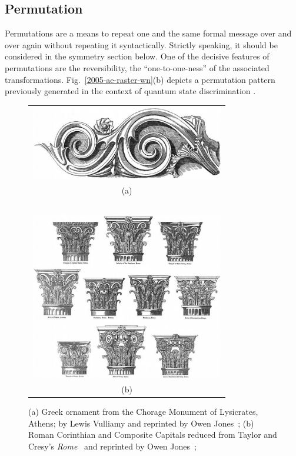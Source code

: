\documentclass[%
 reprint,
 showpacs,
 showkeys,
 amsmath,
 amssymb,
 aps,
 pra,
 longbibliography,
 floatfix,
 ]{revtex4-1}
\begin{document}
\subsection{Permutation}

Permutations are a means to repeat one and the same formal message over and
over again without repeating it syntactically. Strictly speaking, it should
be considered in the symmetry section below. One of the decisive features of
permutations are the reversibility, the ``one-to-one-ness'' of the
associated transformations.
Fig.~\ref{2005-ae-raster-wn}(b) depicts a permutation pattern previously generated
in the context of quantum state discrimination
\cite{DonSvo01,svozil-2002-statepart-prl,svozil-2004-kyoto,svozil-2003-garda}.

\begin{figure}[hptb]
\begin{center}
\begin{tabular}{c}
 \includegraphics[width=8.5cm]{2008-ae-greekornament1}\\
(a)\\
$\;$\\
 \includegraphics[width=8.5cm]{2008-ae-romanornament1}\\
(b)
\end{tabular}
\end{center}
   \caption{(a) Greek ornament from the Chorage Monument of Lysicrates, Athens; by Lewis Vulliamy and
reprinted by Owen Jones~\cite{jones-goo};
(b) Roman Corinthian and Composite Capitals reduced from Taylor and Cresy's {\it Rome}~\cite{Tay-Cr} and reprinted by Owen Jones~\cite{jones-goo};
}
   \label{2005-ae-owen}
 \end{figure}
\end{document}

